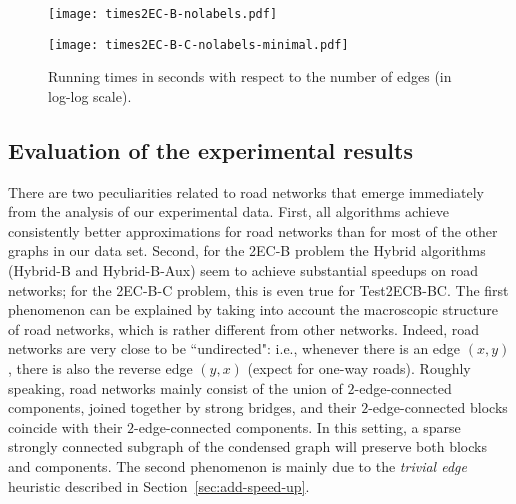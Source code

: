 \documentclass[11pt]{article}
\begin{document}
\begin{figure}[!ht]
\centering
\texttt{[image: times2EC-B-nolabels.pdf]}

\vspace*{0.1in}

\texttt{[image: times2EC-B-C-nolabels-minimal.pdf]}\caption{Running times in seconds with respect to the number of edges (in log-log scale).
}\label{fig:2ecb-running-time}
\end{figure}


\subsection{Evaluation of the experimental results}
\label{sec:discussion}
There are two peculiarities related to road networks that emerge immediately from the analysis of our experimental data.
First, all algorithms achieve consistently better approximations for road networks than for most of the other graphs in our data set.
Second, for the \textsf{2EC-B} problem the \textsf{Hybrid} algorithms (\textsf{Hybrid-B} and \textsf{Hybrid-B-Aux}) seem to achieve substantial speedups on road networks; for the
\textsf{2EC-B-C} problem, this is even true for
\textsf{Test2ECB-BC}.
The first phenomenon can be explained by taking into account the macroscopic structure of road networks, which is rather different from other networks.
Indeed, road networks are very close to be ``undirected": i.e., whenever there is an edge $(x,y)$, there is also the reverse edge $(y,x)$ (expect for one-way roads).
Roughly speaking, road networks mainly consist of the union of $2$-edge-connected components,  joined together by strong bridges, and their $2$-edge-connected blocks coincide with their $2$-edge-connected components.
In this setting, a sparse strongly connected subgraph of the condensed graph will preserve both blocks and components.
The second phenomenon is mainly due to the \emph{trivial edge} heuristic described in Section~\ref{sec:add-speed-up}.
\end{document}
